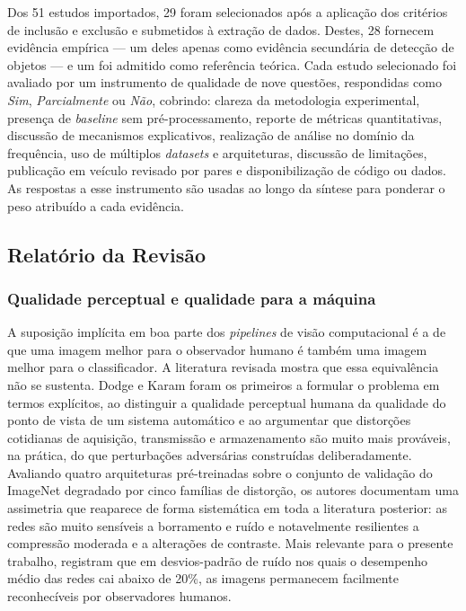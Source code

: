 \documentclass[conference]{IEEEtran}
\begin{document}
Dos 51 estudos importados, 29 foram selecionados após a aplicação dos critérios
de inclusão e exclusão e submetidos à extração de dados. Destes, 28 fornecem
evidência empírica --- um deles \cite{b13} apenas como evidência secundária de
detecção de objetos --- e um \cite{b3} foi admitido como referência teórica.
Cada estudo selecionado foi avaliado por um instrumento de qualidade de nove
questões, respondidas como \textit{Sim}, \textit{Parcialmente} ou \textit{Não},
cobrindo: clareza da metodologia experimental, presença de \textit{baseline}
sem pré-processamento, reporte de métricas quantitativas, discussão de
mecanismos explicativos, realização de análise no domínio da frequência, uso de
múltiplos \textit{datasets} e arquiteturas, discussão de limitações, publicação
em veículo revisado por pares e disponibilização de código ou dados. As
respostas a esse instrumento são usadas ao longo da síntese para ponderar o
peso atribuído a cada evidência.

\subsection{Relatório da Revisão}
\label{sec:rr}

\subsubsection{Qualidade perceptual e qualidade para a máquina}

A suposição implícita em boa parte dos \textit{pipelines} de visão
computacional é a de que uma imagem melhor para o observador humano é também
uma imagem melhor para o classificador. A literatura revisada mostra que essa
equivalência não se sustenta. Dodge e Karam \cite{b1} foram os primeiros a
formular o problema em termos explícitos, ao distinguir a qualidade perceptual
humana da qualidade do ponto de vista de um sistema automático e ao argumentar
que distorções cotidianas de aquisição, transmissão e armazenamento são muito
mais prováveis, na prática, do que perturbações adversárias construídas
deliberadamente. Avaliando quatro arquiteturas pré-treinadas sobre o conjunto
de validação do ImageNet degradado por cinco famílias de distorção, os autores
documentam uma assimetria que reaparece de forma sistemática em toda a
literatura posterior: as redes são muito sensíveis a borramento e ruído e
notavelmente resilientes a compressão moderada e a alterações de contraste.
Mais relevante para o presente trabalho, registram que em desvios-padrão de
ruído nos quais o desempenho médio das redes cai abaixo de 20\%, as imagens
permanecem facilmente reconhecíveis por observadores humanos.
\end{document}
